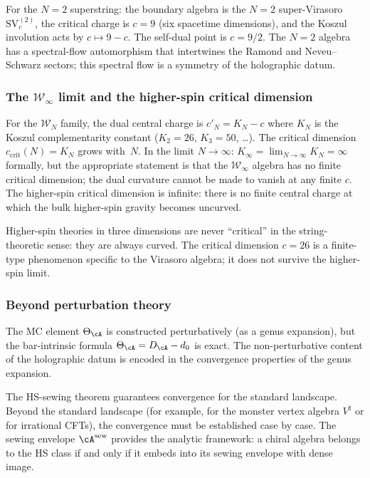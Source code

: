 For the $N=2$ superstring: the boundary algebra is the $N=2$
super-Virasoro $\mathrm{SV}^{(2)}_c$, the critical charge is
$c=9$ (six spacetime dimensions), and the Koszul involution
acts by $c\mapsto 9-c$. The self-dual point is $c=9/2$. The
$N=2$ algebra has a spectral-flow automorphism that intertwines
the Ramond and Neveu--Schwarz sectors; this spectral flow is a
symmetry of the holographic datum.

\subsubsection*{The $\mathcal W_\infty$ limit and the higher-spin
critical dimension}

For the $\mathcal W_N$ family, the dual central charge is
$c'_N=K_N-c$ where $K_N$ is the Koszul complementarity
constant ($K_2=26$, $K_3=50$, \dots). The critical
dimension $c_{\mathrm{crit}}(N)=K_N$ grows with~$N$. In the
limit $N\to\infty$:
$K_\infty=\lim_{N\to\infty}K_N=\infty$ formally, but the
appropriate statement is that the $\mathcal W_\infty$ algebra has
no finite critical dimension; the dual curvature cannot be
made to vanish at any finite $c$. The higher-spin critical
dimension is infinite: there is no finite central charge at
which the bulk higher-spin gravity becomes uncurved.

Higher-spin theories in three dimensions are never ``critical''
in the string-theoretic sense: they are always curved. The
critical dimension $c=26$ is a finite-type phenomenon specific to
the Virasoro algebra; it does not survive the higher-spin limit.

\subsubsection*{Beyond perturbation theory}

The MC element $\Theta_\cA$ is constructed perturbatively (as a
genus expansion), but the bar-intrinsic formula
$\Theta_\cA=D_\cA-d_0$ is exact. The non-perturbative content
of the holographic datum is encoded in the convergence properties
of the genus expansion.

The HS-sewing theorem guarantees convergence for the standard
landscape. Beyond the standard landscape (for example, for the
monster vertex algebra $V^\natural$ or for irrational CFTs), the
convergence must be established case by case. The sewing envelope
$\cA^{\mathrm{sew}}$ provides the analytic framework: a chiral
algebra belongs to the HS class if and only if it embeds into its
sewing envelope with dense image.

